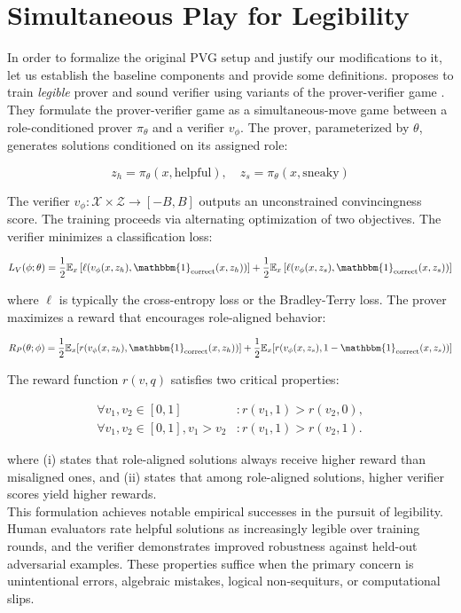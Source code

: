 \section{Simultaneous Play for Legibility}
In order to formalize the original PVG setup and justify our modifications to it, let us establish the baseline components and provide some definitions. \citet{kirchner2024prover} proposes to train \textit{legible} prover and sound verifier using variants of the prover-verifier game \citep{anil2021learning}. They formulate the prover-verifier game as a simultaneous-move game between a role-conditioned prover $\pi_\theta$ and a verifier $v_\phi$. The prover, parameterized by $\theta$, generates solutions conditioned on its assigned role:

$$z_h = \pi_\theta(x, \text{helpful}), \quad z_s = \pi_\theta(x, \text{sneaky})$$

The verifier $v_\phi: \mathcal{X} \times \mathcal{Z} \to [-B, B]$ outputs an unconstrained convincingness score. The training proceeds via alternating optimization of two objectives. The verifier minimizes a classification loss:

$$L_V(\phi; \theta) = \frac{1}{2}\mathbb{E}_x\left[\ell(v_\phi(x, z_h), \mathbbm{1}_{\text{correct}}(x, z_h))\right] + \frac{1}{2}\mathbb{E}_x\left[\ell(v_\phi(x, z_s), \mathbbm{1}_{\text{correct}}(x, z_s))\right]$$

where $\ell$ is typically the cross-entropy loss or the Bradley-Terry loss. The prover maximizes a reward that encourages role-aligned behavior:

$$R_P(\theta; \phi) = \frac{1}{2}\mathbb{E}_x[r(v_\phi(x, z_h), \mathbbm{1}_{\text{correct}}(x, z_h))] + \frac{1}{2}\mathbb{E}_x[r(v_\phi(x, z_s), 1 - \mathbbm{1}_{\text{correct}}(x, z_s))]$$

The reward function $r(v, q)$ satisfies two critical properties:

\[\begin{aligned} \forall v_1, v_2 \in [0, 1] &: r(v_1, 1) > r(v_2, 0), \\ \forall v_1, v_2 \in [0, 1], v_1 > v_2 &: r(v_1, 1) > r(v_2, 1). \end{aligned}\]

\noindent where (i) states that role-aligned solutions always receive higher reward than misaligned ones, and (ii) states that among role-aligned solutions, higher verifier scores yield higher rewards.
\\
This formulation achieves notable empirical successes in the pursuit of legibility. Human evaluators rate helpful solutions as increasingly legible over training rounds, and the verifier demonstrates improved robustness against held-out adversarial examples. These properties suffice when the primary concern is unintentional errors, algebraic mistakes, logical non-sequiturs, or computational slips.

